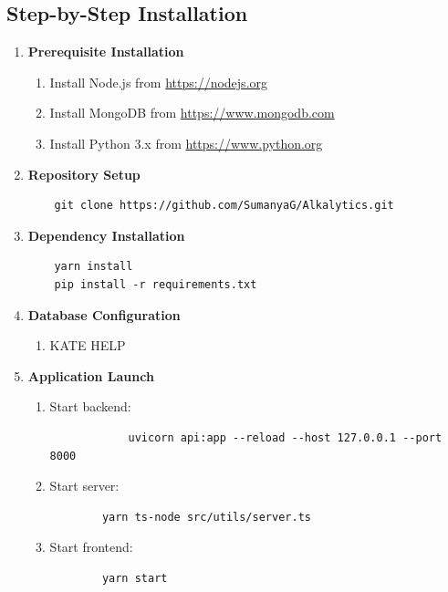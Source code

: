 \documentclass[12pt]{article}
\begin{document}
\subsection{Step-by-Step Installation}
\begin{enumerate}
    \item \textbf{Prerequisite Installation}
    \begin{enumerate}
        \item Install Node.js from \url{https://nodejs.org}
        \item Install MongoDB from \url{https://www.mongodb.com}
        \item Install Python 3.x from \url{https://www.python.org}
    \end{enumerate}
    
    \item \textbf{Repository Setup}
    \begin{verbatim}
    git clone https://github.com/SumanyaG/Alkalytics.git
    \end{verbatim}
    
    \item \textbf{Dependency Installation}
    \begin{verbatim}
    yarn install
    pip install -r requirements.txt
    \end{verbatim}
    
    \item \textbf{Database Configuration}
    \begin{enumerate}
        \item KATE HELP
    \end{enumerate}
    
    \item \textbf{Application Launch}
    \begin{enumerate}
        \item Start backend:
        \begin{verbatim}
            uvicorn api:app --reload --host 127.0.0.1 --port 8000
        \end{verbatim}
        \item Start server:
        \begin{verbatim}
        yarn ts-node src/utils/server.ts
        \end{verbatim}
        \item Start frontend:
        \begin{verbatim}
        yarn start
        \end{verbatim}
    \end{enumerate}
\end{enumerate}
\end{document}
